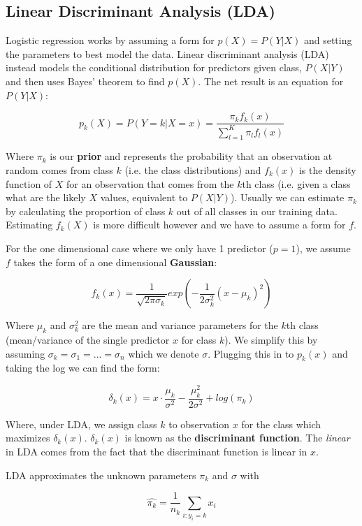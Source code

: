 \subsection{Linear Discriminant Analysis (LDA)}

Logistic regression works by assuming a form for $p(X) = P(Y|X)$ and setting the parameters to best model the data. Linear discriminant analysis (LDA) instead models the conditional distribution for predictors given class, $P(X|Y)$ and then uses Bayes' theorem to find $p(X)$. The net result is an equation for $P(Y|X)$:

$$ p_{k}(X) = P(Y=k|X=x) = \frac{\pi_{k}f_{k}(x)}{\sum^{K}_{l=1} \pi_{l}f_{l}(x)} $$

Where $\pi_{k}$ is our \textbf{prior} and represents the probability that an observation at random comes from class $k$ (i.e. the class distributions) and $f_{k}(x)$ is the density function of $X$ for an observation that comes from the $k$th class (i.e. given a class what are the likely $X$ values, equivalent to $P(X|Y)$). Usually we can estimate $\pi_{k}$ by calculating the proportion of class $k$ out of all classes in our training data. Estimating $f_{k}(X)$ is more difficult however and we have to assume a form for $f$.

For the one dimensional case where we only have 1 predictor ($p=1$), we assume $f$ takes the form of a one dimensional \textbf{Gaussian}:

$$ f_{k}(x) = \frac{1}{\sqrt{2\pi\sigma_{k}}} exp \left( -\frac{1}{2\sigma_{k}^{2}}(x-\mu_{k})^{2} \right) $$

Where $\mu_{k}$ and $\sigma_{k}^{2}$ are the mean and variance parameters for the $k$th class (mean/variance of the single predictor $x$ for class $k$). We simplify this by assuming $\sigma_{k} = \sigma_{1} = ... = \sigma_{n}$ which we denote $\sigma$. Plugging this in to $p_{k}(x)$ and taking the log we can find the form:

$$ \delta_{k}(x) = x\cdot \frac{\mu_{k}}{\sigma^{2}} - \frac{\mu_{k}^{2}}{2\sigma^{2}} + log(\pi_{k}) $$

Where, under LDA, we assign class $k$ to observation $x$ for the class which maximizes $\delta_{k}(x)$. $\delta_{k}(x)$ is known as the \textbf{discriminant function}. The \textit{linear} in LDA comes from the fact that the discriminant function is linear in $x$.

LDA approximates the unknown parameters $\pi_{k}$ and $\sigma$ with

$$ \hat{\pi_{k}} = \frac{1}{n_{k}} \sum_{i:y_{i}=k} x_{i} $$


